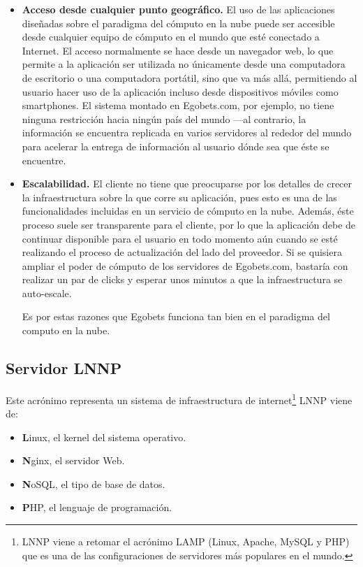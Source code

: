 \begin{itemize}
	\item \textbf{Acceso desde cualquier punto geográfico.} El uso de las aplicaciones diseñadas sobre el paradigma del cómputo en la nube puede ser accesible desde cualquier equipo de cómputo en el mundo que esté conectado a Internet. El acceso normalmente se hace desde un navegador web, lo que permite a la aplicación ser utilizada no únicamente desde una computadora de escritorio o una computadora portátil, sino que va más allá, permitiendo al usuario hacer uso de la aplicación incluso desde dispositivos móviles como smartphones. El sistema montado en Egobets.com, por ejemplo, no tiene ninguna restricción hacia ningún país del mundo —al contrario, la información se encuentra replicada en varios servidores al rededor del mundo para acelerar la entrega de información al usuario dónde sea que éste se encuentre.

	\item \textbf{Escalabilidad.} El cliente no tiene que preocuparse por los detalles de crecer la infraestructura sobre la que corre su aplicación, pues esto es una de las funcionalidades incluidas en un servicio de cómputo en la nube. Además, éste proceso suele ser transparente para el cliente, por lo que la aplicación debe de continuar disponible para el usuario en todo momento aún cuando se esté realizando el proceso de actualización del lado del proveedor. Si se quisiera ampliar el poder de cómputo de los servidores de Egobets.com, bastaría con realizar un par de clicks y esperar unos minutos a que la infraestructura se auto-escale.

Es por estas razones que Egobets funciona tan bien en el paradigma del computo en la nube.

\end{itemize}

\subsection{Servidor LNNP}

Este acrónimo representa un sistema de infraestructura de internet\footnote{LNNP viene a retomar el acrónimo LAMP (Linux, Apache, MySQL y PHP) que es una de las configuraciones de servidores más populares en el mundo.} LNNP viene de:
\begin{itemize}
	\item \textbf{L}inux, el kernel del sistema operativo.
	\item \textbf{N}ginx, el servidor Web.
	\item \textbf{N}oSQL, el tipo de base de datos.
	\item \textbf{P}HP, el lenguaje de programación.
\end{itemize}

